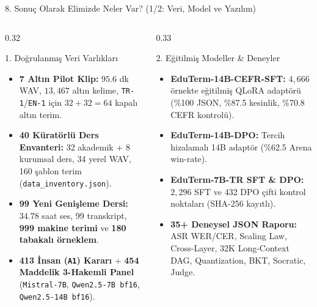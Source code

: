 \documentclass[aspectratio=169,10pt]{beamer}
\begin{document}
\begin{frame}{8. Sonuç Olarak Elimizde Neler Var? (1/2: Veri, Model ve Yazılım)}
\scriptsize
\begin{columns}[T]
\begin{column}{0.32\textwidth}
\begin{block}{1. Doğrulanmış Veri Varlıkları}
\begin{itemize}
    \item \textbf{7 Altın Pilot Klip:} $95.6$ dk WAV, $13{,}467$ altın kelime, \texttt{TR-1}/\texttt{EN-1} için $32+32=64$ kapalı altın terim.
    \item \textbf{40 Küratörlü Ders Envanteri:} 32 akademik + 8 kurumsal ders, 34 yerel WAV, 160 şablon terim (\texttt{data\_inventory.json}).
    \item \textbf{99 Yeni Genişleme Dersi:} $34.78$ saat ses, 99 transkript, \textbf{999 makine terimi} ve \textbf{180 tabakalı örneklem}.
    \item \textbf{413 İnsan (\texttt{A1}) Kararı} + \textbf{454 Maddelik 3-Hakemli Panel} (\texttt{Mistral-7B}, \texttt{Qwen2.5-7B bf16}, \texttt{Qwen2.5-14B bf16}).
\end{itemize}
\end{block}
\end{column}

\begin{column}{0.33\textwidth}
\begin{block}{2. Eğitilmiş Modeller \& Deneyler}
\begin{itemize}
    \item \textbf{EduTerm-14B-CEFR-SFT:} $4{,}666$ örnekte eğitilmiş QLoRA adaptörü (\%100 JSON, \%87.5 kesinlik, \%70.8 CEFR kontrolü).
    \item \textbf{EduTerm-14B-DPO:} Tercih hizalamalı 14B adaptör (\%62.5 Arena win-rate).
    \item \textbf{EduTerm-7B-TR SFT \& DPO:} $2{,}296$ SFT ve 432 DPO çifti kontrol noktaları (SHA-256 kayıtlı).
    \item \textbf{35+ Deneysel JSON Raporu:} ASR WER/CER, Scaling Law, Cross-Layer, 32K Long-Context DAG, Quantization, BKT, Socratic, Judge.
\end{itemize}
\end{block}
\end{column}


\end{columns}
\end{frame}
\end{document}
